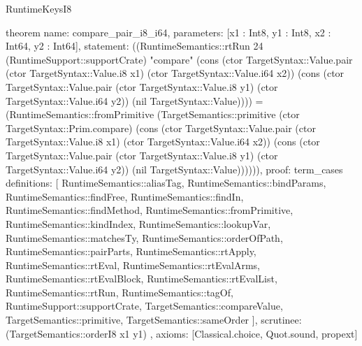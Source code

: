 \begin{lexlean}{RuntimeKeysI8}
\begin{semanticmodule}
theorem{
  name: compare_pair_i8_i64,
  parameters: [x1 : Int8, y1 : Int8, x2 : Int64, y2 : Int64],
  statement: ((RuntimeSemantics::rtRun 24 (RuntimeSupport::supportCrate) "compare" (cons (ctor TargetSyntax::Value.pair (ctor TargetSyntax::Value.i8 x1) (ctor TargetSyntax::Value.i64 x2)) (cons (ctor TargetSyntax::Value.pair (ctor TargetSyntax::Value.i8 y1) (ctor TargetSyntax::Value.i64 y2)) (nil TargetSyntax::Value)))) = (RuntimeSemantics::fromPrimitive (TargetSemantics::primitive (ctor TargetSyntax::Prim.compare) (cons (ctor TargetSyntax::Value.pair (ctor TargetSyntax::Value.i8 x1) (ctor TargetSyntax::Value.i64 x2)) (cons (ctor TargetSyntax::Value.pair (ctor TargetSyntax::Value.i8 y1) (ctor TargetSyntax::Value.i64 y2)) (nil TargetSyntax::Value)))))),
  proof: term_cases{
    definitions: [
      RuntimeSemantics::aliasTag,
      RuntimeSemantics::bindParams,
      RuntimeSemantics::findFree,
      RuntimeSemantics::findIn,
      RuntimeSemantics::findMethod,
      RuntimeSemantics::fromPrimitive,
      RuntimeSemantics::kindIndex,
      RuntimeSemantics::lookupVar,
      RuntimeSemantics::matchesTy,
      RuntimeSemantics::orderOfPath,
      RuntimeSemantics::pairParts,
      RuntimeSemantics::rtApply,
      RuntimeSemantics::rtEval,
      RuntimeSemantics::rtEvalArms,
      RuntimeSemantics::rtEvalBlock,
      RuntimeSemantics::rtEvalList,
      RuntimeSemantics::rtRun,
      RuntimeSemantics::tagOf,
      RuntimeSupport::supportCrate,
      TargetSemantics::compareValue,
      TargetSemantics::primitive,
      TargetSemantics::sameOrder
    ],
    scrutinee: (TargetSemantics::orderI8 x1 y1)
  },
  axioms: [Classical.choice, Quot.sound, propext]
}
\end{semanticmodule}
\end{lexlean}
